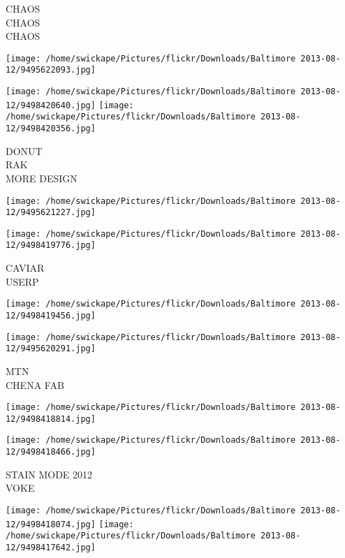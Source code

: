 \documentclass[10pt,letterpaper]{article}
\begin{document}
CHAOS\\
CHAOS\\
CHAOS\\
\pagebreak

\texttt{[image: /home/swickape/Pictures/flickr/Downloads/Baltimore 2013-08-12/9495622093.jpg]}

\vspace{0.25in}
\texttt{[image: /home/swickape/Pictures/flickr/Downloads/Baltimore 2013-08-12/9498420640.jpg]}
\texttt{[image: /home/swickape/Pictures/flickr/Downloads/Baltimore 2013-08-12/9498420356.jpg]}

DONUT\\
RAK\\
MORE DESIGN\\
\pagebreak

\texttt{[image: /home/swickape/Pictures/flickr/Downloads/Baltimore 2013-08-12/9495621227.jpg]}

\vspace{0.25in}
\texttt{[image: /home/swickape/Pictures/flickr/Downloads/Baltimore 2013-08-12/9498419776.jpg]}

CAVIAR\\
USERP\\
\pagebreak

\texttt{[image: /home/swickape/Pictures/flickr/Downloads/Baltimore 2013-08-12/9498419456.jpg]}

\vspace{0.25in}
\texttt{[image: /home/swickape/Pictures/flickr/Downloads/Baltimore 2013-08-12/9495620291.jpg]}

MTN\\
CHENA FAB\\
\pagebreak

\texttt{[image: /home/swickape/Pictures/flickr/Downloads/Baltimore 2013-08-12/9498418814.jpg]}

\vspace{0.25in}
\texttt{[image: /home/swickape/Pictures/flickr/Downloads/Baltimore 2013-08-12/9498418466.jpg]}

STAIN MODE 2012\\
VOKE\\
\pagebreak

\texttt{[image: /home/swickape/Pictures/flickr/Downloads/Baltimore 2013-08-12/9498418074.jpg]}
\texttt{[image: /home/swickape/Pictures/flickr/Downloads/Baltimore 2013-08-12/9498417642.jpg]}
\end{document}

